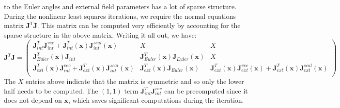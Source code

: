 \documentclass{article}
\begin{document}
to the Euler angles and external field parameters has a lot of sparse structure.
During the nonlinear least squares iterations, we require the normal equations matrix
$\mathbf{J}^T \mathbf{J}$. This matrix can be computed very efficiently by accounting
for the sparse structure in the above matrix. Writing it all out, we have:
\begin{equation}
\mathbf{J}^T \mathbf{J} =
\left(
\begin{array}{ccc}
\mathbf{J}_{int}^T \mathbf{J}_{int}^{vec} + \mathbf{J}_{int}^T(\mathbf{x}) \mathbf{J}_{int}^{scal}(\mathbf{x}) & X & X \\
\mathbf{J}_{Euler}^T(\mathbf{x}) \mathbf{J}_{int} & \mathbf{J}_{Euler}^T(\mathbf{x}) \mathbf{J}_{Euler}(\mathbf{x}) & X \\
\mathbf{J}_{ext}^T(\mathbf{x}) \mathbf{J}_{int}^{vec} + \mathbf{J}_{ext}^T(\mathbf{x}) \mathbf{J}_{int}^{scal}(\mathbf{x})  & \mathbf{J}_{ext}^T(\mathbf{x}) \mathbf{J}_{Euler}(\mathbf{x}) & \mathbf{J}_{ext}^T(\mathbf{x}) \mathbf{J}_{ext}^{vec}(\mathbf{x}) + \mathbf{J}_{ext}^T(\mathbf{x}) \mathbf{J}_{ext}^{scal}(\mathbf{x}) \\
\end{array}
\right)
\end{equation}
The $X$ entries above indicate that the matrix is symmetric and so only the lower half needs to
be computed. The $(1,1)$ term $\mathbf{J}_{int}^T \mathbf{J}_{int}^{vec}$ can be precomputed
since it does not depend on $\mathbf{x}$, which saves significant computations during the
iteration.
\end{document}
